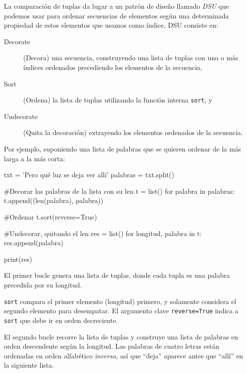 La comparación de tuplas da lugar a un patrón de diseño llamado \emph{DSU} que podemos usar para ordenar secuencias de elementos según una determinada propiedad de estos elementos que usamos como índice. DSU consiste en:

\begin{description}
\item[Decorate] (Decora)
una secuencia, construyendo una lista de tuplas con uno o más índices
ordenados precediendo los elementos de la secuencia,
\item[Sort] (Ordena)
la lista de tuplas utilizando la función interna \texttt{sort}, y
\item[Undecorate] (Quita la decoración)
extrayendo los elementos ordenados de la secuencia.
\end{description}

 
 

Por ejemplo, suponiendo una lista de palabras que se quieren ordenar de
la más larga a la más corta:

\begin{python}
txt = 'Pero qué luz se deja ver allí'
palabras = txt.split()

#Decorar las palabras de la lista con su len
t = list()
for palabra in palabras:
    t.append((len(palabra), palabra))

#Ordenar
t.sort(reverse=True)

#Undecorar, quitando el len
res = list()
for longitud, palabra in t:
    res.append(palabra)

print(res)
\end{python}

El primer bucle genera una lista de tuplas, donde cada tupla es una
palabra precedida por su longitud.

\texttt{sort} compara el primer elemento (longitud) primero, y solamente
considera el segundo elemento para desempatar. El argumento clave
\texttt{reverse=True} indica a \texttt{sort} que debe ir en orden
decreciente.

  

El segundo bucle recorre la lista de tuplas y construye una lista de
palabras en orden descendente según la longitud. Las palabras de cuatro
letras están ordenadas en orden alfabético \emph{inverso}, así que
``deja'' aparece antes que ``allí'' en la siguiente lista.

